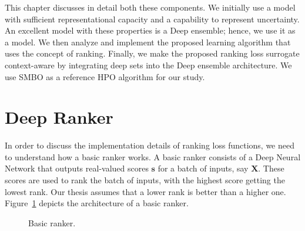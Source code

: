 \documentclass[12pt, twoside, ngerman]{report}
\begin{document}
This chapter discusses in detail both these components.
We initially use a model with sufficient representational capacity and a capability to represent uncertainty.
An excellent model with these properties is a Deep ensemble; hence, we use it as a model.
We then analyze and implement the proposed learning algorithm that uses the concept of ranking.
Finally, we make the proposed ranking loss surrogate context-aware by integrating deep sets into the Deep ensemble architecture.
We use SMBO as a reference HPO algorithm for our study.



\section{Deep Ranker}
\label{sec:BasicScoringModelDNN}

In order to discuss the implementation details of ranking loss functions,  we need to understand how a basic ranker works.
A basic ranker consists of a Deep Neural Network that outputs real-valued scores $\textbf{s}$ for a batch of inputs, say $\textbf{X}$.
These scores are used to rank the batch of inputs, with the highest score getting the lowest rank.
Our thesis assumes that a lower rank is better than a higher one.
Figure~\ref{fig:basicScoringModel} depicts the architecture of a basic ranker.

\begin{figure}[htb]
\centering
{}
\caption{Basic ranker.}
\label{fig:basicScoringModel}
\end{figure}
\end{document}
